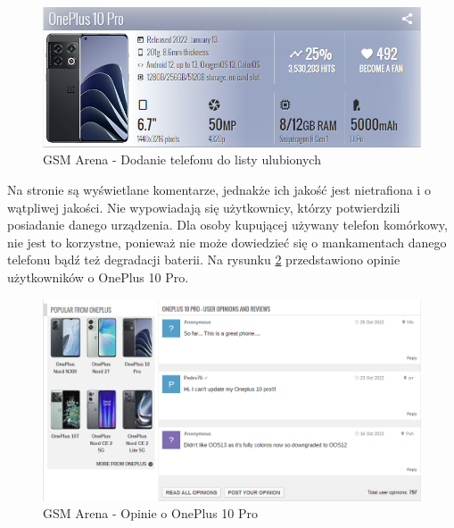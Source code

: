\begin{figure}[H]
    \centering
    \includegraphics[scale=0.7]{img/GSM Arena/GSMArena_become_a_fan.png}
    \caption{GSM Arena - Dodanie telefonu do listy ulubionych}
    \label{GSM_Arena_4}
\end{figure}

Na stronie są wyświetlane komentarze, jednakże ich jakość jest nietrafiona i o wątpliwej jakości. Nie wypowiadają się użytkownicy, którzy potwierdzili posiadanie danego urządzenia. Dla osoby kupującej używany telefon komórkowy, nie jest to korzystne, ponieważ nie może dowiedzieć się o mankamentach danego telefonu bądź też degradacji baterii. Na rysunku \ref*{GSM_Arena_5} przedstawiono opinie użytkowników o OnePlus 10 Pro.
\begin{figure}[H]
    \centering
    \includegraphics[scale=0.52]{img/GSM Arena/Comments.png}
    \caption{GSM Arena - Opinie o OnePlus 10 Pro}
    \label{GSM_Arena_5}
\end{figure}

